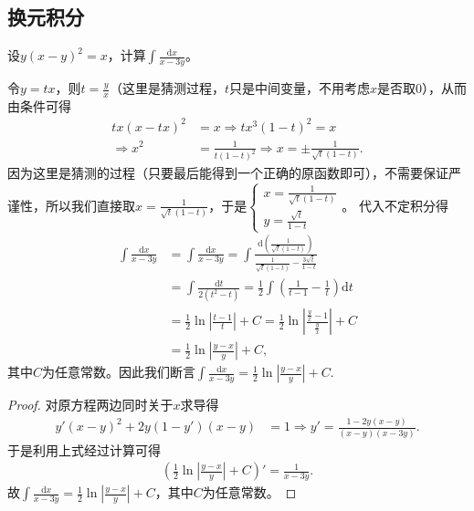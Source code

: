 \documentclass[../../main.tex]{subfiles}%
\begin{document}
\subsection{换元积分}

\begin{example}
设\(y(x - y)^2 = x\)，计算\(\int \frac{\mathrm{d}x}{x - 3y}\)。 
\end{example}
\begin{note}
令\(y = tx\)，则\(t = \frac{y}{x}\)（这里是猜测过程，\(t\)只是中间变量，不用考虑\(x\)是否取\(0\)），从而由条件可得
\begin{align*}
tx(x - tx)^2 &= x \Rightarrow tx^3(1 - t)^2 = x\\
\Rightarrow x^2&=\frac{1}{t(1 - t)^2} \Rightarrow x = \pm\frac{1}{\sqrt{t}(1 - t)}.
\end{align*}
因为这里是猜测的过程（只要最后能得到一个正确的原函数即可），不需要保证严谨性，所以我们直接取\(x=\frac{1}{\sqrt{t}(1 - t)}\)，于是\(\begin{cases}
x=\frac{1}{\sqrt{t}(1 - t)}\\
y=\frac{\sqrt{t}}{1 - t}
\end{cases}\)。
代入不定积分得
\begin{align*}
\int{\frac{\mathrm{d}x}{x - 3y}}&=\int{\frac{\mathrm{d}x}{x - 3y}}=\int{\frac{\mathrm{d}\left(\frac{1}{\sqrt{t}(1 - t)}\right)}{\frac{1}{\sqrt{t}(1 - t)}-\frac{3\sqrt{t}}{1 - t}}}\\
&=\int{\frac{\mathrm{d}t}{2(t^2 - t)}}=\frac{1}{2}\int{\left(\frac{1}{t - 1}-\frac{1}{t}\right)\mathrm{d}t}\\
&=\frac{1}{2}\ln\left|\frac{t - 1}{t}\right| + C=\frac{1}{2}\ln\left|\frac{\frac{y}{x}-1}{\frac{y}{x}}\right| + C\\
&=\frac{1}{2}\ln\left|\frac{y - x}{y}\right| + C,
\end{align*}
其中\(C\)为任意常数。因此我们断言\(\int{\frac{\mathrm{d}x}{x - 3y}}=\frac{1}{2}\ln\left|\frac{y - x}{y}\right| + C\).
\end{note}
\begin{proof}
对原方程两边同时关于\(x\)求导得
\begin{align*}
y'(x - y)^2 + 2y(1 - y')(x - y) &= 1 \Rightarrow y'=\frac{1 - 2y(x - y)}{(x - y)(x - 3y)}.
\end{align*}
于是利用上式经过计算可得
\begin{align*}
\left(\frac{1}{2}\ln\left|\frac{y - x}{y}\right| + C\right)'=\frac{1}{x - 3y}.
\end{align*}
故\(\int{\frac{\mathrm{d}x}{x - 3y}}=\frac{1}{2}\ln\left|\frac{y - x}{y}\right| + C\)，其中\(C\)为任意常数。 
\end{proof}
\end{document}
